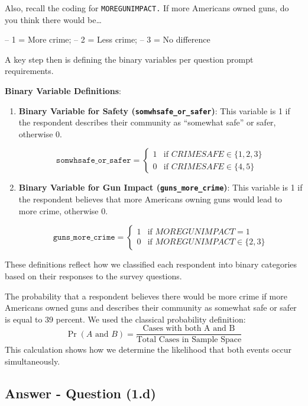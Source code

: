 \documentclass[
  11pt,
]{article}
\begin{document}
Also, recall the coding for \texttt{MOREGUNIMPACT.} If more Americans
owned guns, do you think there would be\ldots{}

-- 1 = More crime; -- 2 = Less crime; -- 3 = No difference

A key step then is defining the binary variables per question prompt
requirements.

\textbf{Binary Variable Definitions}:

\begin{enumerate}
\def\labelenumi{\arabic{enumi}.}
\item
  \textbf{Binary Variable for Safety (\texttt{somwhsafe\_or\_safer})}:
  This variable is 1 if the respondent describes their community as
  ``somewhat safe'' or safer, otherwise 0.

  \[
  \texttt{somwhsafe\_or\_safer} =
  \begin{cases}
     1 & \text{if } CRIMESAFE \in \{1, 2, 3\} \\
     0 & \text{if } CRIMESAFE \in \{4, 5\}
  \end{cases}
  \]
\item
  \textbf{Binary Variable for Gun Impact (\texttt{guns\_more\_crime})}:
  This variable is 1 if the respondent believes that more Americans
  owning guns would lead to more crime, otherwise 0.

  \[
  \texttt{guns\_more\_crime} =
  \begin{cases}
     1 & \text{if } MOREGUNIMPACT = 1 \\
     0 & \text{if } MOREGUNIMPACT \in \{2, 3\}
  \end{cases}
  \]
\end{enumerate}

These definitions reflect how we classified each respondent into binary
categories based on their responses to the survey questions.

The probability that a respondent believes there would be more crime if
more Americans owned guns and describes their community as somewhat safe
or safer is equal to 39 percent. We used the classical probability
definition:
\[\Pr(A\text{ and }B) = \frac{\text{Cases with both A and B}}{\text{Total Cases in Sample Space}}\]
This calculation shows how we determine the likelihood that both events
occur simultaneously.

\subsection{Answer - Question (1.d)}\label{answer---question-1.d}
\end{document}
